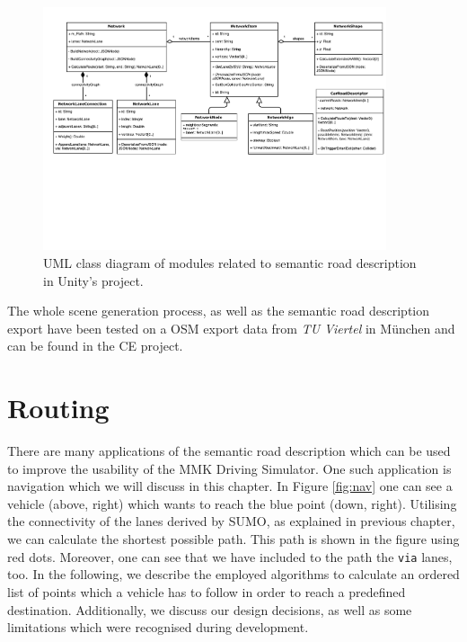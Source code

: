 \begin{figure}[htb]
	\centering
	\includegraphics[width=0.9\textwidth]{figures/unity-uml}
	\caption{UML class diagram of modules related to semantic road description in Unity's project.}
	\label{fig:unity-uml-1}
\end{figure}

The whole scene generation process, as well as the semantic road description export have been tested on a OSM export data from \emph{TU Viertel} in M\"unchen and can be found in the CE project.



\chapter{Routing}
\label{ch:gps}

There are many applications of the semantic road description which can be used to improve the usability of the MMK Driving Simulator. One such application is navigation which we will discuss in this chapter. In Figure \ref{fig:nav} one can see a vehicle (above, right) which wants to reach the blue point (down, right). Utilising the connectivity of the lanes derived by SUMO, as explained in previous chapter, we can calculate the shortest possible path. This path is shown in the figure using red dots. Moreover, one can see that we have included to the path the \texttt{via} lanes, too. In the following, we describe the employed algorithms to calculate an ordered list of points which a vehicle has to follow in order to reach a predefined destination. Additionally, we discuss our design decisions, as well as some limitations which were recognised during development.

